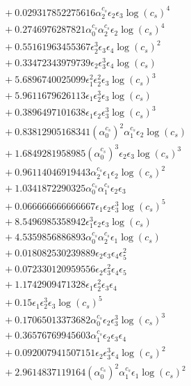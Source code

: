 \documentclass[10pt]{article}
\begin{document}
\begin{align*}
&{}  + 0.029317852275616 \alpha_{2}^{c_s} \epsilon_{2} \epsilon_{3} \log{\left(c_{s} \right)}^{4} \\
&{}  + 0.2746976287821 \alpha_{0}^{c_s} \alpha_{2}^{c_s} \epsilon_{2} \log{\left(c_{s} \right)}^{4} \\
&{}  + 0.55161963455367 \epsilon_{2}^{3} \epsilon_{3} \epsilon_{4} \log{\left(c_{s} \right)}^{2} \\
&{}  + 0.33472343979739 \epsilon_{2} \epsilon_{3}^{3} \epsilon_{4} \log{\left(c_{s} \right)} \\
&{}  + 5.6896740025099 \epsilon_{1}^{2} \epsilon_{2}^{2} \epsilon_{3} \log{\left(c_{s} \right)}^{3} \\
&{}  + 5.9611679626113 \epsilon_{1} \epsilon_{2}^{3} \epsilon_{3} \log{\left(c_{s} \right)} \\
&{}  + 0.3896497101638 \epsilon_{1} \epsilon_{2} \epsilon_{3}^{3} \log{\left(c_{s} \right)}^{3} \\
&{}  + 0.83812905168341 \left(\alpha_{0}^{c_s}\right)^{2} \alpha_{1}^{c_s} \epsilon_{2} \log{\left(c_{s} \right)} \\
&{}  + 1.6849281958985 \left(\alpha_{0}^{c_s}\right)^{3} \epsilon_{2} \epsilon_{3} \log{\left(c_{s} \right)}^{3} \\
&{}  + 0.96114046919443 \alpha_{2}^{c_s} \epsilon_{1} \epsilon_{2} \log{\left(c_{s} \right)}^{2} \\
&{}  + 1.0341872290325 \alpha_{0}^{c_s} \alpha_{1}^{c_s} \epsilon_{2} \epsilon_{3} \\
&{}  + 0.066666666666667 \epsilon_{1} \epsilon_{2} \epsilon_{3}^{3} \log{\left(c_{s} \right)}^{5} \\
&{}  + 8.5496985358942 \epsilon_{1}^{3} \epsilon_{2} \epsilon_{3} \log{\left(c_{s} \right)} \\
&{}  + 4.5359856886893 \alpha_{0}^{c_s} \alpha_{2}^{c_s} \epsilon_{1} \log{\left(c_{s} \right)} \\
&{}  + 0.018082530239889 \epsilon_{2} \epsilon_{3} \epsilon_{4} \epsilon_{5}^{2} \\
&{}  + 0.072330120959556 \epsilon_{2} \epsilon_{3}^{2} \epsilon_{4} \epsilon_{5} \\
&{}  + 1.1742909471328 \epsilon_{1} \epsilon_{2}^{2} \epsilon_{3} \epsilon_{4} \\
&{}  + 0.15 \epsilon_{1} \epsilon_{2}^{3} \epsilon_{3} \log{\left(c_{s} \right)}^{5} \\
&{}  + 0.17065013373682 \alpha_{0}^{c_s} \epsilon_{2} \epsilon_{3}^{3} \log{\left(c_{s} \right)}^{3} \\
&{}  + 0.36576769945603 \alpha_{1}^{c_s} \epsilon_{2} \epsilon_{3} \epsilon_{4} \\
&{}  + 0.092007941507151 \epsilon_{2} \epsilon_{3}^{3} \epsilon_{4} \log{\left(c_{s} \right)}^{2} \\
&{}  + 2.9614837119164 \left(\alpha_{0}^{c_s}\right)^{2} \alpha_{1}^{c_s} \epsilon_{1} \log{\left(c_{s} \right)}^{2}
\end{align*}
\end{document}
